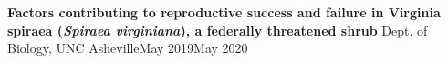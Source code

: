 {\entrybigwrap
    {{\textbf{Factors contributing to reproductive success and failure in Virginia spiraea (\textit{Spiraea virginiana}), a federally threatened shrub}}}
    {{Dept. of Biology, UNC Asheville}{\hfill May 2019\textendash May 2020}}
}
